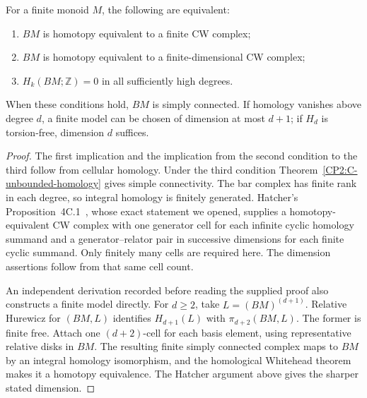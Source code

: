\begin{theorem}
\label{CP2:C-finite-equivalences}
For a finite monoid $M$, the following are equivalent:
\begin{enumerate}
\item $BM$ is homotopy equivalent to a finite CW complex;
\item $BM$ is homotopy equivalent to a finite-dimensional CW complex;
\item $H_k(BM;\mathbb Z)=0$ in all sufficiently high degrees.
\end{enumerate}
When these conditions hold, $BM$ is simply connected.  If homology
vanishes above degree $d$, a finite model can be chosen of dimension
at most $d+1$; if $H_d$ is torsion-free, dimension $d$ suffices.
\end{theorem}
\begin{proof}
The first implication and the implication from the second condition
to the third follow from cellular homology.  Under the third
condition Theorem~\ref{CP2:C-unbounded-homology} gives simple
connectivity.  The bar complex has finite rank in each degree, so
integral homology is finitely generated.  Hatcher's
Proposition~4C.1~\cite{CP2-Hatcher2002}, whose exact statement we
opened, supplies a homotopy-equivalent CW complex with one
generator cell for each infinite cyclic homology summand and a
generator--relator pair in successive dimensions for each finite
cyclic summand.  Only finitely many cells are required here.  The
dimension assertions follow from that same cell count.

An independent derivation recorded before reading the supplied
proof also constructs a finite model directly.  For $d\ge2$,
take $L=(BM)^{(d+1)}$.  Relative Hurewicz for $(BM,L)$ identifies
$H_{d+1}(L)$ with $\pi_{d+2}(BM,L)$.  The former is finite free.
Attach one $(d+2)$-cell for each basis element, using representative
relative disks in $BM$.  The resulting finite simply connected
complex maps to $BM$ by an integral homology isomorphism, and the
homological Whitehead theorem makes it a homotopy equivalence.
The Hatcher argument above gives the sharper stated dimension.
\end{proof}

